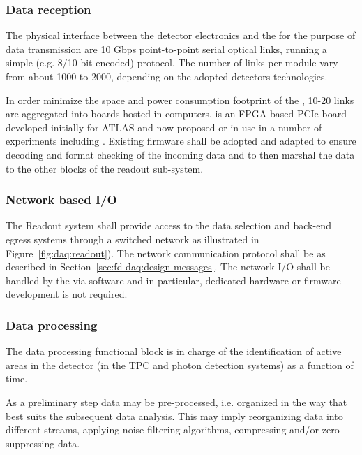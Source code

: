 \subsubsection{Data reception}

The physical interface between the detector electronics and the  for the purpose of data transmission are 10 Gbps point-to-point serial optical links, running a simple (e.g. 8/10 bit encoded) protocol. 
The number of links per  module vary from about 1000 to 2000, depending on the adopted detectors technologies.

In order minimize the space and power consumption footprint of the , 10-20 links are aggregated into  boards hosted in  computers. 
 is an FPGA-based PCIe board developed initially for ATLAS and now proposed or in use in a number of experiments including . 
Existing firmware shall be adopted and adapted to ensure decoding and format checking of the incoming data and to then marshal the data to the other blocks of the readout sub-system.

\subsubsection{Network based I/O}

The Readout system shall provide access to the data selection and back-end egress systems through a  switched network as illustrated in Figure~\ref{fig:daq:readout}).
The network communication protocol shall be as described in Section~\ref{sec:fd-daq:design-messages}.
The network I/O shall be handled by the  via software and in particular, dedicated hardware or firmware development is not required.

\subsubsection{Data processing}

The data processing functional block is in charge of the identification of active areas in the detector (in the TPC and photon detection systems) as a function of time.

As a preliminary step data may be pre-processed, i.e. organized in the way that best suits the subsequent data analysis. This may imply reorganizing data into different streams, applying noise filtering algorithms, compressing and/or zero-suppressing data.

